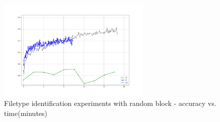 \begin{figure}[htb!]
\centering\includegraphics[width=0.65\textwidth]{content/CL-D-LD.png}
\caption[Experiments with random blocks]{\label{fig:randomblock}Filetype identification experiments with random block - accuracy vs. time(minutes)}%
\end{figure}
